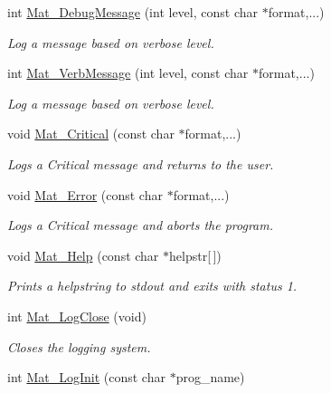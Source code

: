 \begin{DoxyCompactItemize}
int \hyperlink{group__mat__util_ga26e00cfb07551be5201fd9e0f04066d9}{Mat\_\-DebugMessage} (int level, const char $\ast$format,...)
\begin{DoxyCompactList}\small\item\em Log a message based on verbose level. \item\end{DoxyCompactList}\item 
int \hyperlink{group__mat__util_ga64a176ea7e27e38d4242a24f3e3bad24}{Mat\_\-VerbMessage} (int level, const char $\ast$format,...)
\begin{DoxyCompactList}\small\item\em Log a message based on verbose level. \item\end{DoxyCompactList}\item 
void \hyperlink{group__mat__util_gaf51f2bfbb5580f575e4dd79757e2b80c}{Mat\_\-Critical} (const char $\ast$format,...)
\begin{DoxyCompactList}\small\item\em Logs a Critical message and returns to the user. \item\end{DoxyCompactList}\item 
void \hyperlink{group__mat__util_ga058b1cb9a4ca36712857d2b3c4de7ffc}{Mat\_\-Error} (const char $\ast$format,...)
\begin{DoxyCompactList}\small\item\em Logs a Critical message and aborts the program. \item\end{DoxyCompactList}\item 
void \hyperlink{group__mat__util_gaa4039c185e807ed2e9682b66fe2ea331}{Mat\_\-Help} (const char $\ast$helpstr\mbox{[}$\,$\mbox{]})
\begin{DoxyCompactList}\small\item\em Prints a helpstring to stdout and exits with status 1. \item\end{DoxyCompactList}\item 
int \hyperlink{group__mat__util_ga333d15dbd2e7a691621a2af8fc7adc3d}{Mat\_\-LogClose} (void)
\begin{DoxyCompactList}\small\item\em Closes the logging system. \item\end{DoxyCompactList}\item 
int \hyperlink{group__mat__util_ga0d30e03216ceaab7c0a4ff878b26f89f}{Mat\_\-LogInit} (const char $\ast$prog\_\-name)

\end{DoxyCompactItemize}
